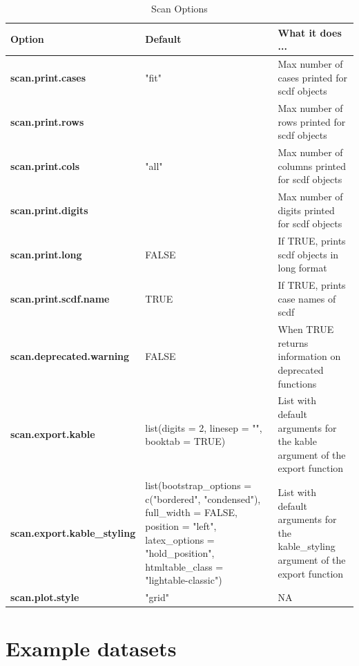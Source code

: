 \documentclass[
]{book}
\begin{document}
\begin{table}

\caption{\label{tab:table-options}Scan Options}
\begin{tabular}[t]{>{\raggedright\arraybackslash}p{15em}>{\raggedright\arraybackslash}p{15em}l}
\toprule
Option & Default & What it does ...\\
\midrule
\textbf{scan.print.cases} & "fit" & Max number of cases printed for scdf objects\\
\textbf{scan.print.rows} & 15 & Max number of rows printed for scdf objects\\
\textbf{scan.print.cols} & "all" & Max number of columns printed for scdf objects\\
\textbf{scan.print.digits} & 2 & Max number of digits printed for scdf objects\\
\textbf{scan.print.long} & FALSE & If TRUE, prints scdf objects in long format\\
\textbf{scan.print.scdf.name} & TRUE & If TRUE, prints case names of scdf\\
\textbf{scan.deprecated.warning} & FALSE & When TRUE returns information on deprecated functions\\
\textbf{scan.export.kable} & list(digits = 2, linesep = "", booktab = TRUE) & List with default arguments for the kable argument of the export function\\
\textbf{scan.export.kable\_styling} & list(bootstrap\_options = c("bordered", "condensed"), full\_width = FALSE, position = "left", latex\_options = "hold\_position", htmltable\_class = "lightable-classic") & List with default arguments for the kable\_styling argument of the export function\\
\textbf{scan.plot.style} & "grid" & NA\\
\bottomrule
\end{tabular}
\end{table}

\hypertarget{example-datasets}{%
\chapter{Example datasets}\label{example-datasets}}
\end{document}
